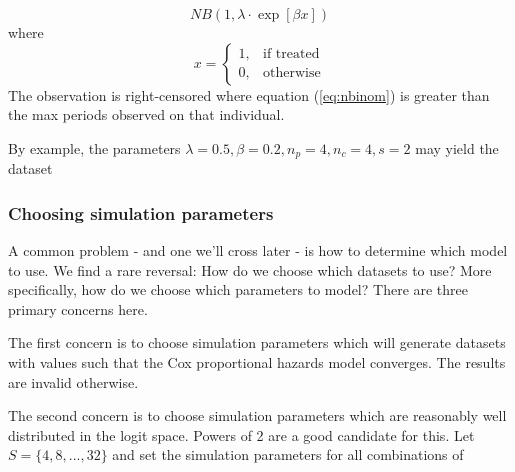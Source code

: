 %
\begin{equation}
\label{eq:nbinom}
NB(1, \lambda \cdot \exp[\beta x])
\end{equation}
%
where
%
$$
  x=\begin{cases}
    1, & \text{if treated}\\
    0, & \text{otherwise}
  \end{cases}
$$
%
The observation is right-censored where equation (\ref{eq:nbinom}) is greater than the max periods observed on that individual.

By example, the parameters $\lambda=0.5, \beta=0.2, n_p=4, n_c=4, s=2$ may yield the dataset


\pgfplotsset{compat=newest}
\mytable
\pgfplotstabletypeset[fixed, %
precision=1, %
dec sep align %
]{\mytable}

\subsubsection{Choosing simulation parameters}

A common problem - and one we'll cross later - is how to determine which model to use. We find a rare reversal: How do we choose which datasets to use? More specifically, how do we choose which parameters to model? There are three primary concerns here.

The first concern is to choose simulation parameters which will generate datasets with values such that the Cox proportional hazards model converges. The results are invalid otherwise. 

The second concern is to choose simulation parameters which are reasonably well distributed in the logit space. Powers of 2 are a good candidate for this. Let $S = \lbrace 4, 8, ..., 32 \rbrace$ and set the simulation parameters for all combinations of

